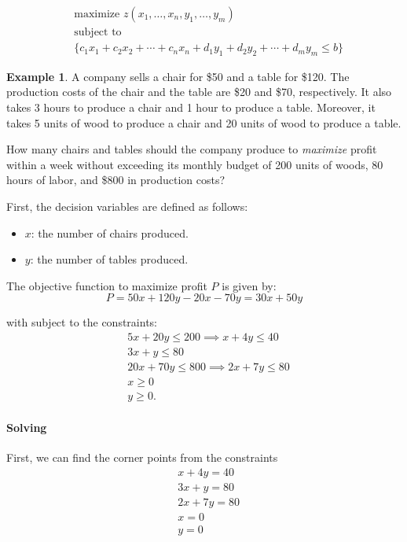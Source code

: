 \documentclass[oneside,11pt,dvipsnames]{book}
\numberwithin{equation}{section}
\theoremstyle{definition}
\newtheorem{example}{Example}[section]
\theoremstyle{remark}
\begin{document}
\[
\begin{aligned}
& \text{maximize } z(x_1, \ldots, x_n, y_1, \ldots, y_m) \\
& \text{subject to } \\
& \{c_1x_1 + c_2x_2 + \cdots + c_nx_n + d_1y_1 + d_2y_2 + \cdots + d_my_m \leq b\}
\end{aligned}
\]


\begin{example}\label{ex:lp-example3}
A company sells a chair for \$50 and a table for \$120. The production costs of the chair and the table are \$20 and \$70, respectively. It also takes 3 hours to produce a chair and 1 hour to produce a table.
Moreover, it takes 5 units of wood to produce a chair and 20 units of wood to produce a table.

How many chairs and tables should the company produce to \emph{maximize} profit within a week without exceeding its monthly budget of 200 units of woods, 80 hours of labor, and \$800 in production costs?

First, the decision variables are defined as follows:
\begin{itemize}
    \item $x$: the number of chairs produced.
    \item $y$: the number of tables produced.
\end{itemize}

The objective function to maximize profit $P$ is given by:
\[
P = 50x + 120y - 20x - 70y = 30x + 50y
\]

with subject to the constraints:
\[
\begin{aligned}
& 5x + 20y \le 200 \implies x + 4y \le 40\\
& 3x + y \le 80 \\
& 20x + 70y \le 800 \implies 2x + 7y \le 80\\
& x \ge 0 \\
& y \ge 0.
\end{aligned}
\]

\paragraph{Solving}

First, we can find the corner points from the constraints
\[
\begin{aligned}
    & x + 4y = 40 \\
    & 3x + y = 80 \\
    & 2x + 7y = 80 \\
    & x = 0 \\
    & y = 0
\end{aligned}
\]


\end{example}
\end{document}
